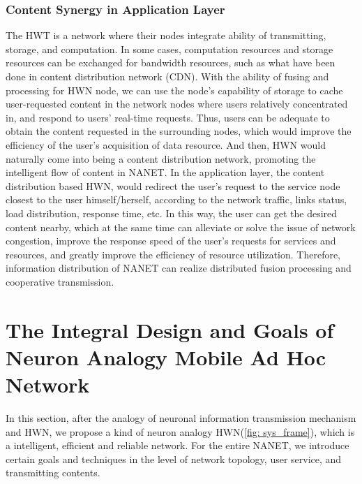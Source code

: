 \documentclass[journal,comsoc]{IEEEtran}
\begin{document}
			\subsubsection{Content Synergy in Application Layer}
				The HWT is a network where their nodes integrate ability of transmitting, storage, and computation.
				In some cases, computation resources and storage resources can be exchanged for bandwidth resources, such as what have been done in content distribution network (CDN). 
				With the ability of fusing and processing for HWN node, we can use the node's capability of storage to cache user-requested content in the network nodes where users relatively concentrated in, and respond to users' real-time requests. Thus, users can be adequate to obtain the content requested in the surrounding nodes, which would improve the efficiency of the user's acquisition of data resource.
				And then, HWN would naturally come into being a content distribution network, promoting the intelligent flow of content in NANET.
				In the application layer, the content distribution based HWN, would redirect the user's request to the service node closest to the user himself/herself, according to the network traffic, links status, load distribution, response time, etc.
				In this way, the user can get the desired content nearby, which at the same time can alleviate or solve the issue of network congestion, improve the response speed of the user's requests for services and resources, and greatly improve the efficiency of resource utilization.
				Therefore, information distribution of NANET can realize distributed fusion processing and cooperative transmission.
		
	
	\section{The Integral Design and Goals of Neuron Analogy Mobile Ad Hoc Network}
	\label{section: general_design}
		In this section, after the analogy of neuronal information transmission mechanism and HWN, 
		we propose a kind of neuron analogy HWN(\ref{fig: sys_frame}), which is a intelligent, efficient and reliable network.
		For the entire NANET, we introduce certain goals and techniques in the level of network topology, user service, and transmitting contents.
		
\end{document}

